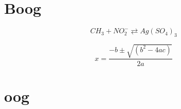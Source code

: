 \documentclass[a4paper, 12pt, titlepage, legno]{article}
\begin{document}
\tableofcontents

\newpage

\section{Boog}
\begin{equation}
C H_{3}+N O_{2}^{-} \rightleftarrows Ag\left(S O_{4}\right)_{3}
\end{equation}

\begin{equation}
x=\frac{-b \pm \sqrt{\left(b^{2}-4 a c\right)}}{2 a}
\end{equation}

\section{oog}
\end{document}
